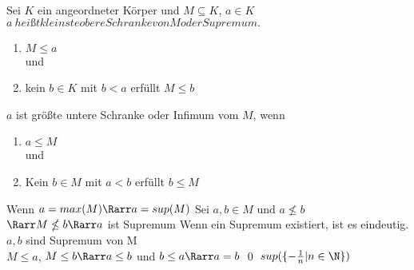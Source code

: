 	Sei $K$ ein angeordneter Körper und $M \subseteq K$, $a \in K$\\
	$a \ heißt kleinste obere Schranke von M oder Supremum.$
	\begin{enumerate}
	\item{$M \leq a$}\\[6pt]
	und
	\item{kein $b \in K$ mit $b < a$ erfüllt $M \leq b$}
	\end{enumerate}
	$a$ ist größte untere Schranke oder Infimum vom $M$, wenn
	\begin{enumerate}
	\item{$a \leq M$}\\[6pt]
	und
	\item{Kein $b \in M$ mit $a < b$ erfüllt $b \leq M$}
	\end{enumerate}
\bem
	Wenn $a = max(M) \Rarr a = sup(M)$ 
\bew
	Sei $a, b \in M$ und $a \nleq b$\\
	$\Rarr M \nleq b \Rarr a$ ist Supremum
\bem
	Wenn ein Supremum existiert, ist es eindeutig.
\bew
	$a, b$ sind Supremum von M\\
	$M \leq a$, $M \leq b \Rarr a \leq b $ und $b \leq a \Rarr a = b$ \qed
\bsp
	$sup(\{ -\frac{1}{n} | n \in \N \})$